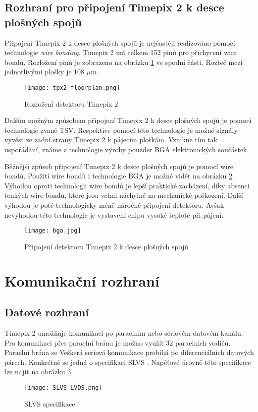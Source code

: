 \subsection{Rozhraní pro připojení Timepix 2 k desce plošných spojů}	%
Připojení Timepix 2 k desce plošných spojů je nejčastěji realizováno pomocí technologie \textit{wire bonding}. Timepix 2 má celkem 152 pinů pro přichycení wire bondů. Rozložení pinů je zobrazeno na obrázku \ref{fig:tpx2_floorplan} ve spodní části. Rozteč mezi jednotlivými plošky je 108 $\mu$m.
\begin{figure}[h!]
	\centering
	\captionsetup{justification=centering}
	\texttt{[image: tpx2\_floorplan.png]}
	\caption{Rozložení detektoru Timepix 2 \cite{tpx2_manual}} 
	\label{fig:tpx2_floorplan}
\end{figure}	

Dalším možným způsobem připojení Timepix 2 k desce plošných spojů je pomocí technologie zvané TSV. Respektive pomocí této technologie je možné signály vyvést ze zadní strany Timepix 2 k pájecím ploškám. Vznikne tím tak uspořádání, známe z technologie výroby pouzder BGA elektronických součástek. 
\par Běžnější způsob připojení Timepix 2 k desce plošných spojů je pomocí wire bondů. Použití wire bondů i technologie BGA je možné vidět na obrázku \ref{fig:bga}. Výhodou oproti technologii wire bondů je lepší praktické zacházení, díky absenci tenkých wire bondů, které jsou velmi náchylné na mechanické poškození. Další výhodou je poté technologicky méně náročné připojení detektoru. Avšak nevýhodou této technologie je vystavení chipu vysoké teplotě při pájení.
\begin{figure}[h!]
	\centering
	\captionsetup{justification=centering}
	\texttt{[image: bga.jpg]}
	\caption{Připojení detektoru Timepix 2 k desce plošných spojů \cite{TSV}} 
	\label{fig:bga}
\end{figure}	

\section{Komunikační rozhraní}
\subsection{Datové rozhraní} %
Timepix 2 umožňuje komunikaci po paraelním nebo sériovém datovém kanálu. Pro komunikaci přes paraelní bránu je možno využít 32 paraelních vodičů. Paraelní brána se  
Veškerá seriová komunikace probíhá po diferenciálních datových párech. Konkrétně se jedná o specifikaci SLVS \cite{SLVS}. Napěťové úrovně této specifikace lze najít na obrázku \ref{fig:SLVS_LVDS}.
\begin{figure}[h!]
	\centering
	\captionsetup{justification=centering}
	\texttt{[image: SLVS\_LVDS.png]}
	\caption{SLVS specifikace \cite{SLVS}} 
	\label{fig:SLVS_LVDS}
\end{figure}	

